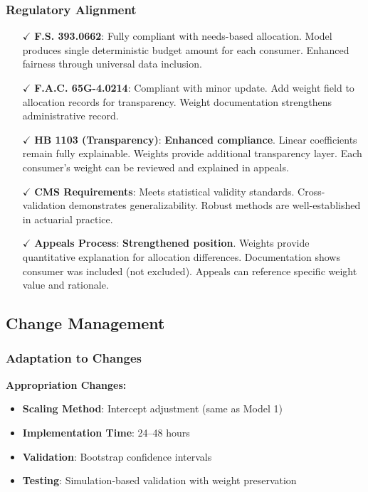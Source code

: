 \subsubsection{Regulatory Alignment}

\begin{itemize}
    \item[$\checkmark$] \textbf{F.S. 393.0662}: Fully compliant with needs-based allocation. Model produces single deterministic budget amount for each consumer. Enhanced fairness through universal data inclusion.
    
    \item[$\checkmark$] \textbf{F.A.C. 65G-4.0214}: Compliant with minor update. Add weight field to allocation records for transparency. Weight documentation strengthens administrative record.
    
    \item[$\checkmark$] \textbf{HB 1103 (Transparency)}: \textbf{Enhanced compliance}. Linear coefficients remain fully explainable. Weights provide additional transparency layer. Each consumer's weight can be reviewed and explained in appeals.
    
    \item[$\checkmark$] \textbf{CMS Requirements}: Meets statistical validity standards. Cross-validation demonstrates generalizability. Robust methods are well-established in actuarial practice.
    
    \item[$\checkmark$] \textbf{Appeals Process}: \textbf{Strengthened position}. Weights provide quantitative explanation for allocation differences. Documentation shows consumer was included (not excluded). Appeals can reference specific weight value and rationale.
\end{itemize}

\subsection{Change Management}

\subsubsection{Adaptation to Changes}

\textbf{Appropriation Changes:}
\begin{itemize}
    \item \textbf{Scaling Method}: Intercept adjustment (same as Model 1)
    \item \textbf{Implementation Time}: 24--48 hours
    \item \textbf{Validation}: Bootstrap confidence intervals
    \item \textbf{Testing}: Simulation-based validation with weight preservation
\end{itemize}

